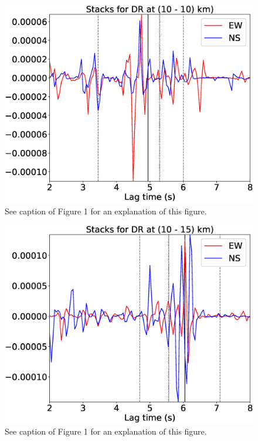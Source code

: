 \documentclass[letterpaper, 12pt]{article}
\begin{document}
\begin{figure}[H]
\includegraphics[width=\linewidth]{figures/intervals/DR_010_010_stacks.eps}
\caption{See caption of Figure 1 for an explanation of this figure.}
\end{figure}

\begin{figure}[H]
\includegraphics[width=\linewidth]{figures/intervals/DR_010_015_stacks.eps}
\caption{See caption of Figure 1 for an explanation of this figure.}
\end{figure}
\end{document}

